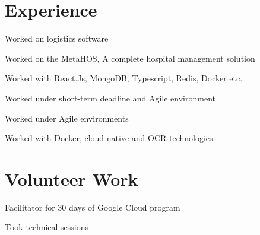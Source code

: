 \documentclass[]{deedy-resume-openfont}
\begin{document}
\begin{minipage}[t]{0.66\textwidth} 


\section{Experience}

\vspace{\topsep} 
\begin{tightemize}
\item Worked on logistics software
\end{tightemize}
\sectionsep

\begin{tightemize}
\item Worked on the MetaHOS, A complete hospital management solution 
\item Worked with React.Js, MongoDB, Typescript, Redis, Docker etc.
\item Worked under short-term deadline and Agile environment
\end{tightemize}
\sectionsep

\begin{tightemize}
\item Worked under Agile environments
\item Worked with Docker, cloud native and OCR technologies
\end{tightemize}
\sectionsep


\section{Volunteer Work}
\begin{tightemize}
\item Facilitator for 30 days of Google Cloud program
\item Took technical sessions
\end{tightemize}
\sectionsep


\end{minipage}
\end{document}
